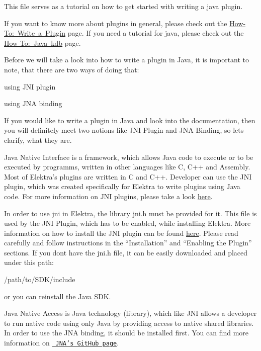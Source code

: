 This file serves as a tutorial on how to get started with writing a java plugin.

If you want to know more about plugins in general, please check out the \mbox{\hyperlink{doc_tutorials_plugins_md}{How-\/\+To\+: Write a Plugin}} page. If you need a tutorial for java, please check out the \mbox{\hyperlink{doc_tutorials_java-kdb_md}{How-\/\+To\+: Java kdb}} page.

Before we will take a look into how to write a plugin in Java, it is important to note, that there are two ways of doing that\+:


\begin{DoxyItemize}
\item using J\+NI plugin
\item using J\+NA binding
\end{DoxyItemize}

If you would like to write a plugin in Java and look into the documentation, then you will definitely meet two notions like {\ttfamily J\+NI Plugin} and {\ttfamily J\+NA Binding}, so let\textquotesingle{}s clarify, what they are.

Java Native Interface is a framework, which allows Java code to execute or to be executed by programms, written in other languages like C, C++ and Assembly. Most of Elektra’s plugins are written in C and C++. Developer can use the J\+NI plugin, which was created specifically for Elektra to write plugins using Java code. For more information on J\+NI plugins, please take a look \mbox{\hyperlink{autotoc_md341_src_plugins_jni_README_md}{here}}.

In order to use {\ttfamily jni} in Elektra, the library {\ttfamily jni.\+h} must be provided for it. This file is used by the J\+NI Plugin, which has to be enabled, while installing Elektra. More information on how to install the J\+NI plugin can be found \mbox{\hyperlink{autotoc_md341_src_plugins_jni_README_md}{here}}. Please read carefully and follow instructions in the “\+Installation” and “\+Enabling the Plugin” sections. If you don\textquotesingle{}t have the {\ttfamily jni.\+h} file, it can be easily downloaded and placed under this path\+:


\begin{DoxyItemize}
\item {\ttfamily /path/to/\+S\+D\+K/include}
\end{DoxyItemize}

or you can reinstall the Java S\+DK.

Java Native Access is Java technology (library), which like J\+NI allows a developer to run native code using only Java by providing access to native shared libraries. In order to use the J\+NA binding, it should be installed first. You can find more information on \href{https://github.com/java-native-access/jna}{\texttt{ J\+N\+A’s Git\+Hub page}}.

